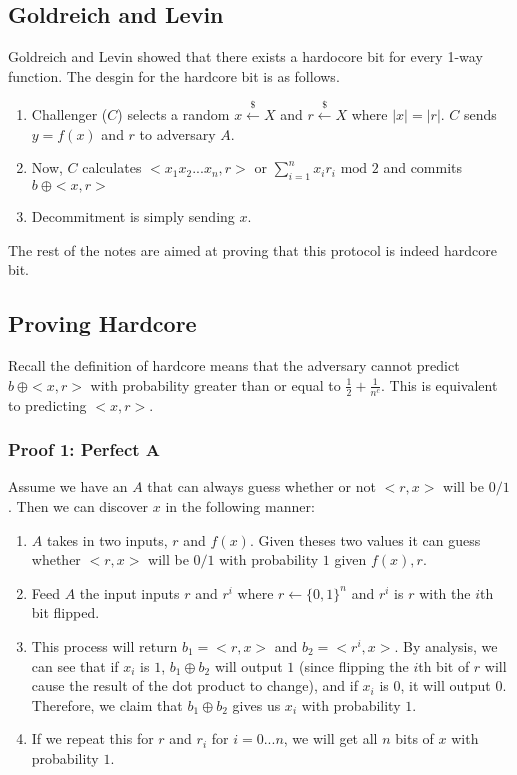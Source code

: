 \documentclass[11pt]{article}
\begin{document}
\subsection{Goldreich and Levin}
Goldreich and Levin showed that there exists a hardocore bit for every 1-way function. The desgin for the hardcore bit is as follows.
\begin{enumerate}
    \item Challenger ($C$) selects a random $x \overset{\$}{\leftarrow} X$ and $r \overset{\$}{\leftarrow} X$ where $|x| = |r|$. $C$ sends $y=f(x)$ and $r$ to adversary $A$.
    \item Now, $C$ calculates $<x_1x_2...x_n, r>$ or $\sum_{i=1}^{n} x_ir_i \text{ mod }2$ and commits $b \ \oplus <x,r>$ 
    \item Decommitment is simply sending $x$.
\end{enumerate}
The rest of the notes are aimed at proving that this protocol is indeed hardcore bit.

\subsection{Proving Hardcore}
Recall the definition of hardcore means that the adversary cannot predict $b \ \oplus <x,r>$ with probability greater than or equal to $\frac{1}{2} + \frac{1}{n^c}$. This is equivalent to predicting $<x,r>$.

\subsubsection{Proof 1: Perfect A}
Assume we have an $A$ that can always guess whether or not $<r,x>$ will be $0/1$. Then we can discover $x$ in the following manner:
\begin{enumerate}
    \item $A$ takes in two inputs, $r$ and $f(x)$. Given theses two values it can guess whether $<r,x>$ will be $0/1$ with probability $1$ given $f(x),r$.
    \item Feed $A$ the input inputs $r$ and $r^i$ where $r \leftarrow \{0,1\}^{n}$ and $r^i$ is $r$ with the $i$th bit flipped.
    \item This process will return $b_1 = <r,x>$ and $b_2 = <r^i,x>$. By analysis, we can see that if $x_i$ is $1$, $b_1 \oplus b_2$ will output $1$ (since flipping the $i$th bit of $r$ will cause the result of the dot product to change), and if $x_i$ is $0$, it will output $0$. Therefore, we claim that $b_1 \oplus b_2$ gives us $x_i$ with probability $1$.
    \item If we repeat this for $r$ and $r_i$ for $i=0...n$, we will get all $n$ bits of $x$ with probability $1$. 
\end{enumerate}
\end{document}

